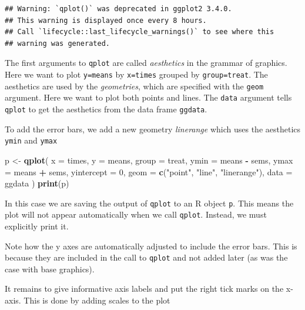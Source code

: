 \documentclass[
]{book}
\newenvironment{Shaded}{\begin{snugshade}}{\end{snugshade}}
\newcommand{\AttributeTok}[1]{\textcolor[rgb]{0.13,0.29,0.53}{#1}}
\newcommand{\DecValTok}[1]{\textcolor[rgb]{0.00,0.00,0.81}{#1}}
\newcommand{\FunctionTok}[1]{\textcolor[rgb]{0.13,0.29,0.53}{\textbf{#1}}}
\newcommand{\NormalTok}[1]{#1}
\newcommand{\OtherTok}[1]{\textcolor[rgb]{0.56,0.35,0.01}{#1}}
\newcommand{\SpecialCharTok}[1]{\textcolor[rgb]{0.81,0.36,0.00}{\textbf{#1}}}
\newcommand{\StringTok}[1]{\textcolor[rgb]{0.31,0.60,0.02}{#1}}
\begin{document}
\begin{verbatim}
## Warning: `qplot()` was deprecated in ggplot2 3.4.0.
## This warning is displayed once every 8 hours.
## Call `lifecycle::last_lifecycle_warnings()` to see where this
## warning was generated.
\end{verbatim}

The first arguments to \texttt{qplot} are called \emph{aesthetics} in the
grammar of graphics. Here we want to plot \texttt{y=means} by
\texttt{x=times} grouped by \texttt{group=treat}. The aesthetics
are used by the \emph{geometries}, which are specified with the
\texttt{geom} argument. Here we want to plot both points and
lines. The \texttt{data} argument tells \texttt{qplot} to get the
aesthetics from the data frame \texttt{ggdata}.

To add the error bars, we add a new geometry \emph{linerange} which uses
the aesthetics \texttt{ymin} and \texttt{ymax}

\begin{Shaded}
\begin{Highlighting}[]
\NormalTok{p }\OtherTok{\textless{}{-}} \FunctionTok{qplot}\NormalTok{(}
  \AttributeTok{x =}\NormalTok{ times, }\AttributeTok{y =}\NormalTok{ means, }\AttributeTok{group =}\NormalTok{ treat,}
  \AttributeTok{ymin =}\NormalTok{ means }\SpecialCharTok{{-}}\NormalTok{ sems, }\AttributeTok{ymax =}\NormalTok{ means }\SpecialCharTok{+}\NormalTok{ sems,}
  \AttributeTok{yintercept =} \DecValTok{0}\NormalTok{, }\AttributeTok{geom =} \FunctionTok{c}\NormalTok{(}\StringTok{"point"}\NormalTok{, }\StringTok{"line"}\NormalTok{, }\StringTok{"linerange"}\NormalTok{),}
  \AttributeTok{data =}\NormalTok{ ggdata}
\NormalTok{)}
\FunctionTok{print}\NormalTok{(p)}
\end{Highlighting}
\end{Shaded}

In this case we are saving the output of \texttt{qplot} to an R
object \texttt{p}. This means the plot will not appear automatically
when we call \texttt{qplot}. Instead, we must explicitly print it.

Note how the y axes are automatically adjusted to include the error
bars. This is because they are included in the call to \texttt{qplot}
and not added later (as was the case with base graphics).

It remains to give informative axis labels and put the right tick
marks on the x-axis. This is done by adding scales to the plot

\begin{Shaded}
\end{Shaded}
\end{document}
